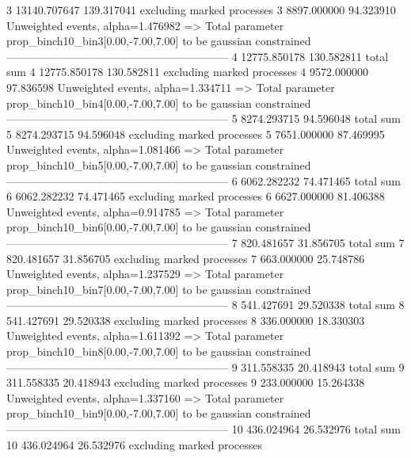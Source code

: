 3          13140.707647    139.317041      excluding marked processes    
3          8897.000000     94.323910       Unweighted events, alpha=1.476982
  => Total parameter prop_binch10_bin3[0.00,-7.00,7.00] to be gaussian constrained
------------------------------------------------------------
4          12775.850178    130.582811      total sum                     
4          12775.850178    130.582811      excluding marked processes    
4          9572.000000     97.836598       Unweighted events, alpha=1.334711
  => Total parameter prop_binch10_bin4[0.00,-7.00,7.00] to be gaussian constrained
------------------------------------------------------------
5          8274.293715     94.596048       total sum                     
5          8274.293715     94.596048       excluding marked processes    
5          7651.000000     87.469995       Unweighted events, alpha=1.081466
  => Total parameter prop_binch10_bin5[0.00,-7.00,7.00] to be gaussian constrained
------------------------------------------------------------
6          6062.282232     74.471465       total sum                     
6          6062.282232     74.471465       excluding marked processes    
6          6627.000000     81.406388       Unweighted events, alpha=0.914785
  => Total parameter prop_binch10_bin6[0.00,-7.00,7.00] to be gaussian constrained
------------------------------------------------------------
7          820.481657      31.856705       total sum                     
7          820.481657      31.856705       excluding marked processes    
7          663.000000      25.748786       Unweighted events, alpha=1.237529
  => Total parameter prop_binch10_bin7[0.00,-7.00,7.00] to be gaussian constrained
------------------------------------------------------------
8          541.427691      29.520338       total sum                     
8          541.427691      29.520338       excluding marked processes    
8          336.000000      18.330303       Unweighted events, alpha=1.611392
  => Total parameter prop_binch10_bin8[0.00,-7.00,7.00] to be gaussian constrained
------------------------------------------------------------
9          311.558335      20.418943       total sum                     
9          311.558335      20.418943       excluding marked processes    
9          233.000000      15.264338       Unweighted events, alpha=1.337160
  => Total parameter prop_binch10_bin9[0.00,-7.00,7.00] to be gaussian constrained
------------------------------------------------------------
10         436.024964      26.532976       total sum                     
10         436.024964      26.532976       excluding marked processes    
